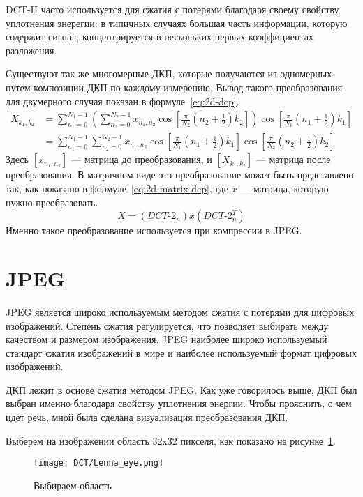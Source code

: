 DCT-II часто используется для сжатия с потерями благодаря своему свойству уплотнения энерегии:
в типичных случаях большая часть информации, которую содержит сигнал, концентрируется в нескольких
первых коэффициентах разложения.

Существуют так же многомерные ДКП, которые получаются из одномерных путем композиции ДКП по каждому измерению.
Вывод такого преобразования для двумерного случая показан в формуле~\ref{eq:2d-dcp}.
\begin{align}
    X_{k_1,k_2} &= \nonumber
    \sum_{n_1=0}^{N_1-1}
    \left( \sum_{n_2=0}^{N_2-1}
    x_{n_1,n_2} 
    \cos \left[\frac{\pi}{N_2} \left(n_2+\frac{1}{2}\right) k_2 \right]\right)
    \cos \left[\frac{\pi}{N_1} \left(n_1+\frac{1}{2}\right) k_1 \right]\\
    &= \sum_{n_1=0}^{N_1-1}
    \sum_{n_2=0}^{N_2-1}
    x_{n_1,n_2} 
    \cos \left[\frac{\pi}{N_1} \left(n_1+\frac{1}{2}\right) k_1 \right]
    \cos \left[\frac{\pi}{N_2} \left(n_2+\frac{1}{2}\right) k_2 \right] \label{eq:2d-dcp}
\end{align}
Здесь $[x_{n_1,n_2}]$ --- матрица до преобразования, и $[X_{k_1,k_2}]$ --- матрица
после преобразования.
В матричном виде это преобразование может быть представлено так, как показано
в формуле~\ref{eq:2d-matrix-dcp}, где $x$ --- матрица, которую нужно преобразовать.
\begin{equation} \label{eq:2d-matrix-dcp}
    X = ({DCT}\text{-}2_n) x ({DCT}\text{-}2_n ^ T)
\end{equation}
Именно такое преобразование используется при компрессии в JPEG.

\section{JPEG}
JPEG является широко используемым методом сжатия с потерями для цифровых изображений.
Степень сжатия регулируется, что позволяет выбирать между качеством и размером изображения.
JPEG наиболее широко используемый стандарт сжатия изображений в мире и
наиболее используемый формат цифровых изображений.

ДКП лежит в основе сжатия методом JPEG. Как уже говорилось выше,
ДКП был выбран именно благодаря свойству уплотнения энергии. Чтобы прояснить,
о чем идет речь, мной была сделана визуализация преобразования ДКП.

Выберем на изображении область 32x32 пикселя, как показано на рисунке~\ref{img:lenna-eye}.

\begin{figure}[ht!]
    \centering
    \texttt{[image: DCT/Lenna\_eye.png]}
    \caption{Выбираем область}
    \label{img:lenna-eye}
\end{figure}

